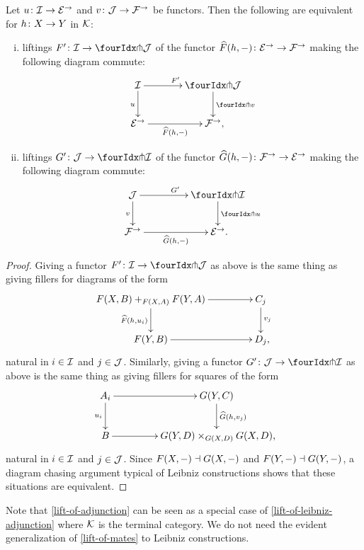 \documentclass[reqno,10pt,a4paper,oneside,draft]{amsart}
\begin{document}
\begin{proposition} \label{lift-of-leibniz-adjunction}
Let $u \co \cal{I} \to \catE^\to$ and $v \co \cal{J} \to \cal{F}^\to$ be functors.
Then the following are equivalent for $h \co X \to Y$ in $\cal{K}$:
\begin{enumerate}[(i)]
\item liftings $F' \co \cal{I} \to \liftl{\cal{J}}$ of the functor $\widehat{F}(h, \arghole) \co \catE^\to \to \cal{F}^\to$ making the following diagram commute:
\[
\xymatrix@C=1.2cm{
  \cal{I}
  \ar[r]^{F'}
  \ar[d]_{u}
&
  \liftl{\cal{J}}
  \ar[d]^{\liftl{v}}
\\
  \catE^\to
  \ar[r]_-{\widehat{F}(h, \arghole)}
&
  \cal{F}^\to
\rlap{,}}
\]
\item liftings $G' \co \cal{J} \to \liftr{\cal{I}}$ of the functor $\widehat{G}(h, \arghole) \co \cal{F}^\to \to \catE^\to$ making the following diagram commute:
\[
\xymatrix@C+2em{
  \cal{J}
  \ar[d]_{v}
  \ar[r]^{G'}
&
  \liftr{\cal{I}}
  \ar[d]^{\liftr{u}}
\\
  \cal{F}^\to
  \ar[r]_-{\widehat{G}(h, \arghole)}
&
  \catE^\to
\rlap{.}}
\]
\end{enumerate}
\end{proposition}

\begin{proof}
Giving a functor $F' \co \cal{I} \to \liftl{\cal{J}}$ as above is the same thing as giving fillers for diagrams of the form
\[
\xymatrix@C+2em{
  F(X,B) +_{F(X,A)} F(Y,A)
  \ar[d]_{\widehat{F}(h, u_i)}
  \ar[r]
&
  C_j
  \ar[d]^{v_j}
\\
  F(Y, B)
  \ar[r]
&
  D_j
\rlap{,}}
\]
natural in $i \in \cal{I}$ and $j \in \cal{J}$.
Similarly, giving a functor $G' \co \cal{J} \to \liftl{\cal{I}}$ as above is the same thing as giving fillers for squares of the form
\[
\xymatrix@C+2em{
  A_i
  \ar[d]_{u_i}
  \ar[r]
&
  G(Y, C)
  \ar[d]^{\widehat{G}(h, v_j)}
\\
  B
  \ar[r]
&
  G(Y, D) \times_{G(X,D)} G(X, D)
\rlap{,}}
\]
natural in $i \in \cal{I}$ and $j \in \cal{J}$.
Since $F(X, \arghole) \dashv G(X, \arghole)$ and $F(Y, \arghole) \dashv G(Y, \arghole)$, a diagram chasing argument typical of Leibniz constructions shows that these situations are equivalent.
\end{proof}

Note that \cref{lift-of-adjunction} can be seen as a special case of \cref{lift-of-leibniz-adjunction} where $\cal{K}$ is the terminal category.
We do not need the evident generalization of \cref{lift-of-mates} to Leibniz constructions.
\end{document}
